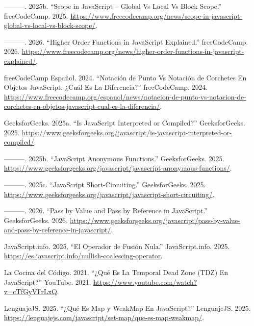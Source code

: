 \documentclass[
  letterpaper,
  DIV=11,
  numbers=noendperiod]{scrreprt}
\newlength{\cslhangindent}
\newenvironment{CSLReferences}[2] %
 {\begin{list}{}{%
  \setlength{\itemindent}{0pt}
  \setlength{\leftmargin}{0pt}
  \setlength{\parsep}{0pt}
  \ifodd #1
   \setlength{\leftmargin}{\cslhangindent}
   \setlength{\itemindent}{-1\cslhangindent}
  \fi
  \setlength{\itemsep}{#2\baselineskip}}}
 {\end{list}}
\begin{document}
\begin{CSLReferences}{1}{0}
---------. 2025b. {``Scope in JavaScript -- Global Vs Local Vs Block
Scope.''} freeCodeCamp. 2025.
\url{https://www.freecodecamp.org/news/scope-in-javascript-global-vs-local-vs-block-scope/}.

---------. 2026. {``Higher Order Functions in JavaScript Explained.''}
freeCodeCamp. 2026.
\url{https://www.freecodecamp.org/news/higher-order-functions-in-javascript-explained/}.

freeCodeCamp Español. 2024. {``Notación de Punto Vs Notación de
Corchetes En Objetos JavaScript: ¿Cuál Es La Diferencia?''}
freeCodeCamp. 2024.
\url{https://www.freecodecamp.org/espanol/news/notacion-de-punto-vs-notacion-de-corchetes-en-objetos-javascript-cual-es-la-diferencia/}.

GeeksforGeeks. 2025a. {``Is JavaScript Interpreted or Compiled?''}
GeeksforGeeks. 2025.
\url{https://www.geeksforgeeks.org/javascript/is-javascript-interpreted-or-compiled/}.

---------. 2025b. {``JavaScript Anonymous Functions.''} GeeksforGeeks.
2025.
\url{https://www.geeksforgeeks.org/javascript/javascript-anonymous-functions/}.

---------. 2025c. {``JavaScript Short-Circuiting.''} GeeksforGeeks.
2025.
\url{https://www.geeksforgeeks.org/javascript/javascript-short-circuiting/}.

---------. 2026. {``Pass by Value and Pass by Reference in
JavaScript.''} GeeksforGeeks. 2026.
\url{https://www.geeksforgeeks.org/javascript/pass-by-value-and-pass-by-reference-in-javascript/}.

JavaScript.info. 2025. {``El Operador de Fusión Nula.''}
JavaScript.info. 2025.
\url{https://es.javascript.info/nullish-coalescing-operator}.

La Cocina del Código. 2021. {``¿Qué Es La Temporal Dead Zone (TDZ) En
JavaScript?''} YouTube. 2021.
\url{https://www.youtube.com/watch?v=cTfGyVFrLxQ}.

LenguajeJS. 2025. {``¿Qué Es Map y WeakMap En JavaScript?''} LenguajeJS.
2025.
\url{https://lenguajejs.com/javascript/set-map/que-es-map-weakmap/}.


\end{CSLReferences}
\end{document}
